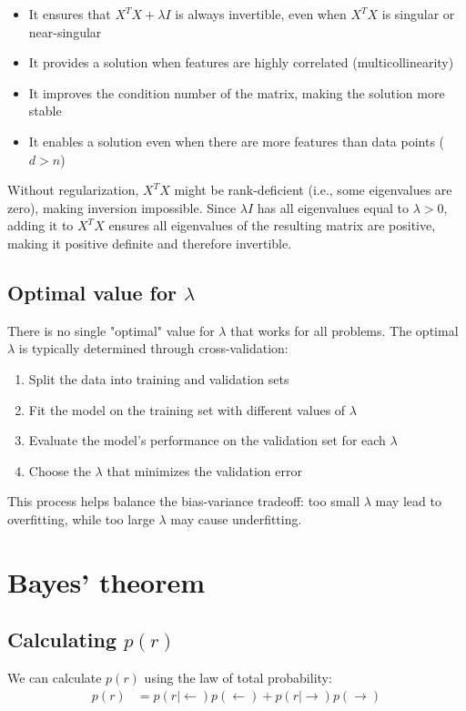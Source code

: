 \documentclass{article}
\begin{document}
\begin{itemize}
\item It ensures that $X^TX + \lambda I$ is always invertible, even when $X^TX$ is singular or near-singular
\item It provides a solution when features are highly correlated (multicollinearity)
\item It improves the condition number of the matrix, making the solution more stable
\item It enables a solution even when there are more features than data points ($d > n$)
\end{itemize}

Without regularization, $X^TX$ might be rank-deficient (i.e., some eigenvalues are zero), making inversion impossible. Since $\lambda I$ has all eigenvalues equal to $\lambda > 0$, adding it to $X^TX$ ensures all eigenvalues of the resulting matrix are positive, making it positive definite and therefore invertible.

\subsection{Optimal value for $\lambda$}
There is no single "optimal" value for $\lambda$ that works for all problems. The optimal $\lambda$ is typically determined through cross-validation:

\begin{enumerate}
\item Split the data into training and validation sets
\item Fit the model on the training set with different values of $\lambda$
\item Evaluate the model's performance on the validation set for each $\lambda$
\item Choose the $\lambda$ that minimizes the validation error
\end{enumerate}

This process helps balance the bias-variance tradeoff: too small $\lambda$ may lead to overfitting, while too large $\lambda$ may cause underfitting.

\section{Bayes' theorem}

\subsection{Calculating $p(r)$}
We can calculate $p(r)$ using the law of total probability:
\begin{align}
p(r) &= p(r|\leftarrow)p(\leftarrow) + p(r|\rightarrow)p(\rightarrow)
\end{align}
\end{document}
